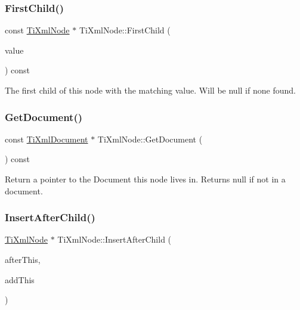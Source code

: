 \subsubsection{\texorpdfstring{First\+Child()}{FirstChild()}}
{\footnotesize\ttfamily const \hyperlink{class_ti_xml_node}{Ti\+Xml\+Node} $\ast$ Ti\+Xml\+Node\+::\+First\+Child (\begin{DoxyParamCaption}\item[{const char $\ast$}]{value }\end{DoxyParamCaption}) const}

The first child of this node with the matching \textquotesingle{}value\textquotesingle{}. Will be null if none found. \mbox{\label{class_ti_xml_node_adcb070acefcbaedaa0673d82e530538b}} 
\subsubsection{\texorpdfstring{Get\+Document()}{GetDocument()}}
{\footnotesize\ttfamily const \hyperlink{class_ti_xml_document}{Ti\+Xml\+Document} $\ast$ Ti\+Xml\+Node\+::\+Get\+Document (\begin{DoxyParamCaption}{ }\end{DoxyParamCaption}) const}

Return a pointer to the Document this node lives in. Returns null if not in a document. \mbox{\label{class_ti_xml_node_a274db3292218202805c093f66a964cb5}} 
\subsubsection{\texorpdfstring{Insert\+After\+Child()}{InsertAfterChild()}}
{\footnotesize\ttfamily \hyperlink{class_ti_xml_node}{Ti\+Xml\+Node} $\ast$ Ti\+Xml\+Node\+::\+Insert\+After\+Child (\begin{DoxyParamCaption}\item[{\hyperlink{class_ti_xml_node}{Ti\+Xml\+Node} $\ast$}]{after\+This,  }\item[{const \hyperlink{class_ti_xml_node}{Ti\+Xml\+Node} \&}]{add\+This }\end{DoxyParamCaption})}

